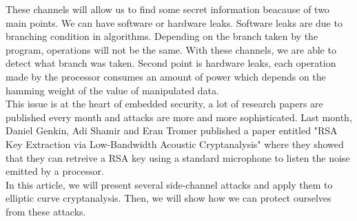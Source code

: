 \documentclass[journal]{IEEEtran}
\begin{document}
These channels will allow us to find some secret information beacause of two main points. We can have software or hardware leaks. Software leaks are due to branching condition in algorithms. Depending on the branch taken by the program, operations will not be the same. With these channels, we are able to detect what branch was taken. Second point is hardware leaks, each operation made by the processor consumes an amount of power which depends on the hamming weight of the value of manipulated data.\\

This issue is at the heart of embedded security, a lot of research papers are published every month and attacks are more and more sophisticated. Last month, Daniel Genkin, Adi Shamir and Eran Tromer published a paper entitled "RSA Key Extraction via Low-Bandwidth Acoustic Cryptanalysis" where they showed that they can retreive a RSA key using a standard microphone to listen the noise emitted by a processor.\\

In this article, we will present several side-channel attacks and apply them to elliptic curve cryptanalysis. Then, we will show how we can protect ourselves from these attacks.





%
%

\end{document}
